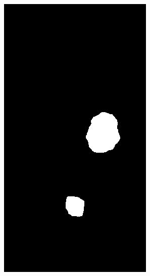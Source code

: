 \begin{figure}[h]
\begin{subfigure}[b]{0.18\textwidth}
         \includegraphics[width=\textwidth]{images/results/base/lighting_fire_y.png}
     \end{subfigure}
    \hfill
     \begin{subfigure}[b]{0.18\textwidth}
         \centering

\end{subfigure}
\end{figure}
